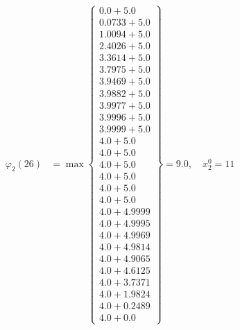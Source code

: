 \documentclass{article}
\begin{document}
\begin{align*}
\varphi_{2}(26) &= \max \left\{ \begin{array}{c}
0.0 + 5.0 \\
 0.0733 + 5.0 \\
 1.0094 + 5.0 \\
 2.4026 + 5.0 \\
 3.3614 + 5.0 \\
 3.7975 + 5.0 \\
 3.9469 + 5.0 \\
 3.9882 + 5.0 \\
 3.9977 + 5.0 \\
 3.9996 + 5.0 \\
 3.9999 + 5.0 \\
 4.0 + 5.0 \\
 4.0 + 5.0 \\
 4.0 + 5.0 \\
 4.0 + 5.0 \\
 4.0 + 5.0 \\
 4.0 + 5.0 \\
 4.0 + 4.9999 \\
 4.0 + 4.9995 \\
 4.0 + 4.9969 \\
 4.0 + 4.9814 \\
 4.0 + 4.9065 \\
 4.0 + 4.6125 \\
 4.0 + 3.7371 \\
 4.0 + 1.9824 \\
 4.0 + 0.2489 \\
 4.0 + 0.0
\end{array} \right\}=9.0, \quad x_{2}^0=11\\
  

\end{align*}
\end{document}
